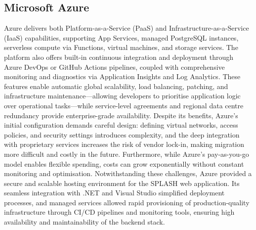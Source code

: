 \subsection{Microsoft Azure}
Azure delivers both Platform-as-a-Service (PaaS) and Infrastructure-as-a-Service (IaaS) capabilities, supporting App Services, managed PostgreSQL instances, serverless compute via Functions, virtual machines, and storage services. The platform also offers built-in continuous integration and deployment through Azure DevOps or GitHub Actions pipelines, coupled with comprehensive monitoring and diagnostics via Application Insights and Log Analytics. These features enable automatic global scalability, load balancing, patching, and infrastructure maintenance—allowing developers to prioritise application logic over operational tasks—while service-level agreements and regional data centre redundancy provide enterprise-grade availability. Despite its benefits, Azure’s initial configuration demands careful design: defining virtual networks, access policies, and security settings introduces complexity, and the deep integration with proprietary services increases the risk of vendor lock-in, making migration more difficult and costly in the future. Furthermore, while Azure’s pay-as-you-go model enables flexible spending, costs can grow exponentially without constant monitoring and optimisation. Notwithstanding these challenges, Azure provided a secure and scalable hosting environment for the SPLASH web application. Its seamless integration with .NET and Visual Studio simplified deployment processes, and managed services allowed rapid provisioning of production-quality infrastructure through CI/CD pipelines and monitoring tools, ensuring high availability and maintainability of the backend stack.

